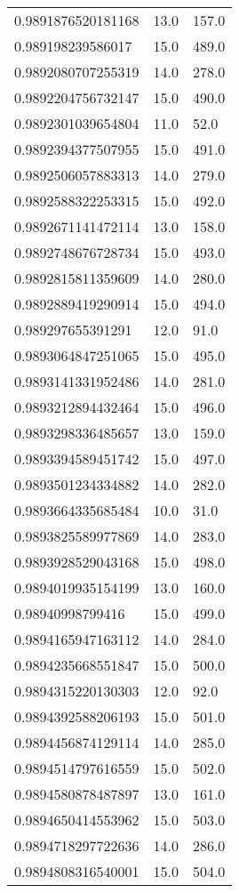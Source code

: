 \begin{center}
\begin{supertabular}[H]{p{0.30\textwidth}p{0.05\textwidth}p{0.05\textwidth}}
0.9891876520181168 & 13.0 & 157.0 \\ 
0.989198239586017 & 15.0 & 489.0 \\ 
0.9892080707255319 & 14.0 & 278.0 \\ 
0.9892204756732147 & 15.0 & 490.0 \\ 
0.9892301039654804 & 11.0 & 52.0 \\ 
0.9892394377507955 & 15.0 & 491.0 \\ 
0.9892506057883313 & 14.0 & 279.0 \\ 
0.9892588322253315 & 15.0 & 492.0 \\ 
0.9892671141472114 & 13.0 & 158.0 \\ 
0.9892748676728734 & 15.0 & 493.0 \\ 
0.9892815811359609 & 14.0 & 280.0 \\ 
0.9892889419290914 & 15.0 & 494.0 \\ 
0.989297655391291 & 12.0 & 91.0 \\ 
0.9893064847251065 & 15.0 & 495.0 \\ 
0.9893141331952486 & 14.0 & 281.0 \\ 
0.9893212894432464 & 15.0 & 496.0 \\ 
0.9893298336485657 & 13.0 & 159.0 \\ 
0.9893394589451742 & 15.0 & 497.0 \\ 
0.9893501234334882 & 14.0 & 282.0 \\ 
0.9893664335685484 & 10.0 & 31.0 \\ 
0.9893825589977869 & 14.0 & 283.0 \\ 
0.9893928529043168 & 15.0 & 498.0 \\ 
0.9894019935154199 & 13.0 & 160.0 \\ 
0.98940998799416 & 15.0 & 499.0 \\ 
0.9894165947163112 & 14.0 & 284.0 \\ 
0.9894235668551847 & 15.0 & 500.0 \\ 
0.9894315220130303 & 12.0 & 92.0 \\ 
0.9894392588206193 & 15.0 & 501.0 \\ 
0.9894456874129114 & 14.0 & 285.0 \\ 
0.9894514797616559 & 15.0 & 502.0 \\ 
0.9894580878487897 & 13.0 & 161.0 \\ 
0.9894650414553962 & 15.0 & 503.0 \\ 
0.9894718297722636 & 14.0 & 286.0 \\ 
0.9894808316540001 & 15.0 & 504.0 \\ 

\end{supertabular}
\end{center}
